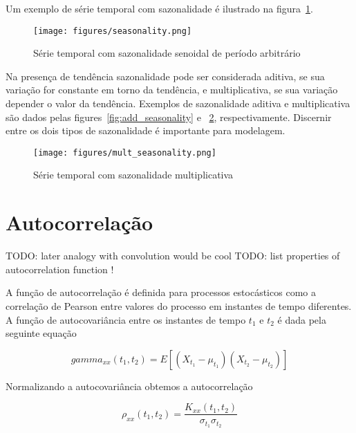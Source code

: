 Um exemplo de série temporal com sazonalidade é ilustrado na
figura~\ref{fig:seasonality}.

\begin{figure}[H]
    \centering
    \texttt{[image: figures/seasonality.png]}
    \caption{Série temporal com sazonalidade senoidal de período arbitrário}
    \label{fig:seasonality}
\end{figure}

Na presença de tendência sazonalidade pode ser considerada aditiva, se sua
variação for constante em torno da tendência, e multiplicativa, se sua variação
depender o valor da tendência. Exemplos de sazonalidade aditiva e
multiplicativa são dados pelas figures~\ref{fig:add_seasonality} e
~\ref{fig:mult_seasonality}, respectivamente. Discernir entre os dois tipos de
sazonalidade é importante para modelagem.


\begin{figure}[H]
    \centering
    \texttt{[image: figures/mult\_seasonality.png]}
    \caption{Série temporal com sazonalidade multiplicativa}
    \label{fig:mult_seasonality}
\end{figure}


\section{Autocorrelação}

TODO: later analogy with convolution would be cool
TODO: list properties of autocorrelation function !

A função de autocorrelação é definida para processos estocásticos como a
correlação de Pearson entre valores do processo em instantes de tempo
diferentes. A função de autocovariância entre os instantes de tempo $t_1$ e
$t_2$ é dada pela seguinte equação

\begin{equation}\label{eq:raw_autocorr}
    gamma_{xx}(t_1, t_2) = E[(X_{t_1} - \mu_{t_1})(X_{t_2} -\mu_{t_2})]
\end{equation}

Normalizando a autocovariância obtemos a autocorrelação

$$\rho_{xx}(t_1, t_2) =\frac{K_{xx}(t_1, t_2)}{\sigma_{t_1}\sigma_{t_2}}$$


